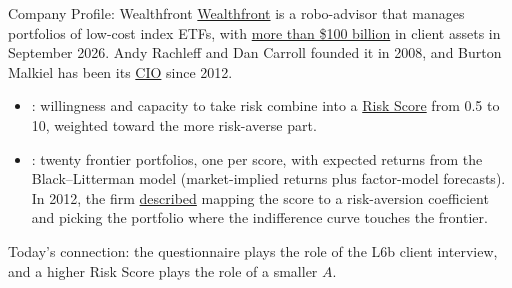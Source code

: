 \documentclass[aspectratio=169,11pt]{beamer}
\begin{document}
\begin{frame}{Company Profile: Wealthfront}
\href{https://www.wealthfront.com/}{Wealthfront} is a robo-advisor that manages portfolios
of low-cost index ETFs, with
\href{https://www.sec.gov/Archives/edgar/data/0001524566/000162828026061131/q227earningsrelease.htm}{more than \$100 billion}
in client assets in September 2026. Andy Rachleff and Dan Carroll founded it in 2008, and
Burton Malkiel has been its
\href{https://www.wealthfront.com/blog/burton-malkiel-joins-wealthfront-as-cio/}{CIO} since 2012.
\begin{itemize}\setlength{\itemsep}{0.3em}
\item {}: willingness and capacity to take risk combine into a
\href{https://research.wealthfront.com/whitepapers/investment-methodology/}{Risk Score}
from 0.5 to 10, weighted toward the more risk-averse part.
\item {}: twenty frontier portfolios, one per score, with
expected returns from the Black--Litterman model (market-implied returns plus
factor-model forecasts). In 2012, the firm \href{https://www.wealthfront.com/blog/what-is-risk-tolerance/}{described} mapping
the score to a risk-aversion coefficient and picking the portfolio where the indifference
curve touches the frontier.
\end{itemize}
Today's connection: the questionnaire plays the role of the L6b client interview, and a
higher Risk Score plays the role of a smaller $A$.
\end{frame}
\end{document}
